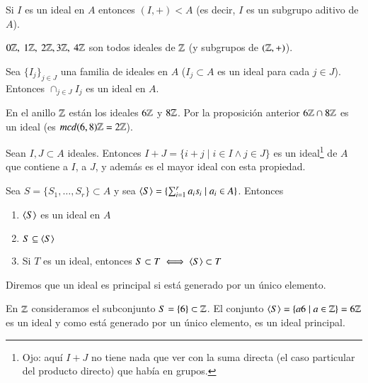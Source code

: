 \begin{pro}
	Si $I$ es un ideal en $A$ entonces $(I, +) < A$ (es decir, $I$ es un subgrupo aditivo de $A$).
\end{pro}

\begin{ej}
	$0\mathbb{Z},\ 1\mathbb{Z},\ 2\mathbb{Z}, 3\mathbb{Z},\ 4\mathbb{Z}$ son todos ideales de $\mathbb{Z}$ (y subgrupos de $(\mathbb{Z}, +)$).
\end{ej}

\begin{thm}
	Sea $\{I_j\}_{j \in J}$ una familia de ideales en $A$ ($I_j \subset A$ es un ideal para cada $j \in J$). Entonces $\cap_{j \in J} I_j$ es un ideal en $A$.
\end{thm}

\begin{ej}
	En el anillo $\mathbb{Z}$ están los ideales $6\mathbb{Z}$ y $8\mathbb{Z}$. Por la proposición anterior $6\mathbb{Z} \cap 8\mathbb{Z}$ es un ideal (es $mcd(6,8)\mathbb{Z} = 2\mathbb{Z}$).
\end{ej}

\begin{pro}
	Sean $I, J \subset A$ ideales. Entonces $I + J = \{i + j \mid i \in I \land j \in J\}$ es un ideal\footnote{Ojo: aquí $I+J$ no tiene nada que ver con la suma directa (el caso particular del producto directo) que había en grupos.} de $A$ que contiene a $I$, a $J$, y además es el mayor ideal con esta propiedad.
\end{pro}

\begin{pro}
	Sea $S = \{S_1, \dots, S_r\} \subset A$ y sea $\langle S\rangle = \{\sum_{i=1}^{r}a_is_i \mid a_i \in A\}$. Entonces
	\begin{enumerate}
		\item $\langle S\rangle$ es un ideal en $A$
		\item $S \subseteq \langle S\rangle$
		\item Si $T$ es un ideal, entonces $S \subset T \iff \langle S\rangle \subset T$
	\end{enumerate}
\end{pro}

\begin{dfn}
	Diremos que un ideal es principal si está generado por un único elemento.
\end{dfn}

\begin{ej}
	En $\mathbb{Z}$ consideramos el subconjunto $S = \{6\} \subset \mathbb{Z}$. El conjunto $\langle S\rangle = \{a6 \mid a \in \mathbb{Z}\} = 6\mathbb{Z}$ es un ideal y como está generado por un único elemento, es un ideal principal.
\end{ej}

